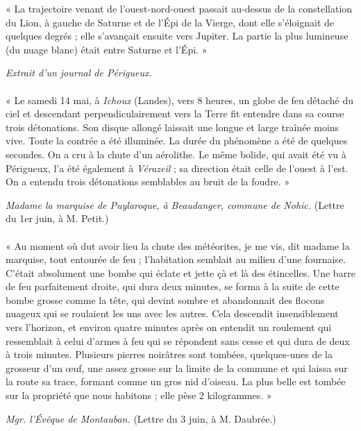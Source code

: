 \documentclass[a4paper, 11pt, oneside, polutonikogreek, french]{article}
\begin{document}
« La trajectoire venant de l'ouest-nord-ouest passait au-dessus de la constellation du Lion, à gauche de Saturne et de l'Épi de la Vierge, dont elle s'éloignait de quelques degrés ; elle s'avançait ensuite vers Jupiter. La partie la plus lumineuse (du nuage blanc) était entre Saturne et l'Épi. »
\begin{center}
\emph{Extrait d'un journal de Périgueux.}
\end{center}
\paragraph{}
« Le samedi 14 mai, à \emph{Ichoux} (Landes), vers 8 heures, un globe de feu détaché du ciel et descendant perpendiculairement vers la Terre fit entendre dans sa course trois détonations. Son disque allongé laissait une longue et large traînée moins vive. Toute la contrée a été illuminée. La durée du phénomène a été de quelques secondes. On a cru à la chute d'un aérolithe. Le même bolide, qui avait été vu à Périgueux, l'a été également à \emph{Vérazeil} ; sa direction était celle de l'ouest à l'est. On a entendu trois détonations semblables au bruit de la foudre. »
\begin{center}
\emph{Madame la marquise de Puylaroque, à Beaudanger, commune de Nohic.} (Lettre du 1er juin, à M. Petit.)
\end{center}
\paragraph{}
« Au moment où dut avoir lieu la chute des météorites, je me vis, dit madame la marquise, tout entourée de feu ; l'habitation semblait au milieu d'une fournaise. C'était absolument une bombe qui éclate et jette çà et là des étincelles. Une barre de feu parfaitement droite, qui dura deux minutes, se forma à la suite de cette bombe grosse comme la tête, qui devint sombre et abandonnait des flocons nuageux qui se roulaient les uns avec les autres. Cela descendit insensiblement vers l'horizon, et environ quatre minutes après on entendit un roulement qui ressemblait à celui d'armes à feu qui se répondent sans cesse et qui dura de deux à trois minutes. Plusieurs pierres noirâtres sont tombées, quelques-unes de la grosseur d'un œuf, une assez grosse sur la limite de la commune et qui laissa sur la route sa trace, formant comme un gros nid d'oiseau. La plus belle est tombée sur la propriété que nous habitons ; elle pèse 2 kilogrammes. »
\begin{center}
\emph{Mgr. l'Évêque de Montauban.} (Lettre du 3 juin, à M. Daubrée.)
\end{center}
\end{document}
